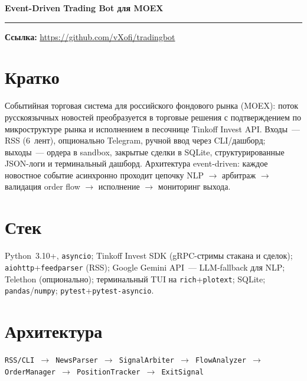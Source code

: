\documentclass[10pt,a4paper]{article}
\begin{document}
\begin{center}
{\LARGE\bfseries Event-Driven Trading Bot для MOEX}
\end{center}

\vspace{2pt}\hrule\vspace{3pt}

\textbf{Ссылка:} \url{https://github.com/vXofi/tradingbot}

\section*{Кратко}
{\sloppy
Событийная торговая система для российского фондового рынка (MOEX): поток русскоязычных новостей преобразуется в торговые решения с подтверждением по микроструктуре рынка и исполнением в песочнице Tinkoff Invest API. Входы~--- RSS (6~лент), опционально Telegram, ручной ввод через CLI/дашборд; выходы~--- ордера в sandbox, закрытые сделки в SQLite, структурированные JSON-логи и терминальный дашборд. Архитектура event-driven: каждое новостное событие асинхронно проходит цепочку NLP $\to$ арбитраж $\to$ валидация order flow $\to$ исполнение $\to$ мониторинг выхода.\par}

\section*{Стек}
{\sloppy
Python~3.10+, \texttt{asyncio}; Tinkoff Invest SDK (gRPC-стримы стакана и сделок); \texttt{aiohttp}+\texttt{feedparser} (RSS); Google Gemini API~--- LLM-fallback для NLP; Telethon (опционально); терминальный TUI на \texttt{rich}+\texttt{plotext}; SQLite; \texttt{pandas}/\texttt{numpy}; \texttt{pytest}+\texttt{pytest-asyncio}.\par}

\section*{Архитектура}
{\small\texttt{RSS/CLI $\to$ NewsParser $\to$ SignalArbiter $\to$ FlowAnalyzer $\to$ OrderManager $\to$ PositionTracker $\to$ ExitSignal}}
\end{document}

